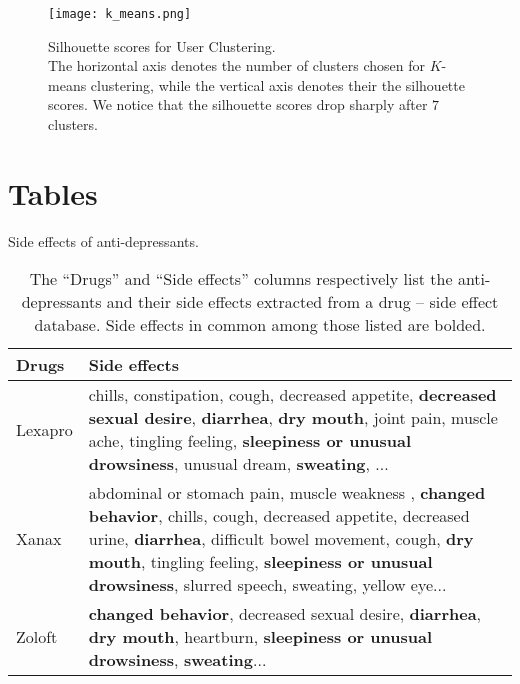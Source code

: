 \documentclass{bmcart}
\begin{document}
\begin{backmatter}
\begin{figure}[h!]
    \label{fig:PCA}
\end{figure}
\begin{figure}[h!]
    \centering
    \captionsetup{justification=centering}
    \texttt{[image: k\_means.png]}
    \caption{Silhouette scores for User Clustering. \\ The horizontal axis denotes the number of clusters chosen for $K$-means clustering, while the vertical axis denotes their the silhouette scores. We notice that the silhouette scores drop sharply after $7$ clusters.}
    \label{fig:KMeans}
\end{figure}

\pagebreak
\section*{Tables}
\begin{table}[h!]
  \caption{Side effects of anti-depressants.} 
  \footnotesize
  \begin{tabular}{l p{11cm}}
    \hline
    Drugs & Side effects \\ \hline
    Lexapro & chills, constipation, cough, decreased appetite, \textbf{decreased sexual desire}, \textbf{diarrhea}, \textbf{dry mouth}, joint pain, muscle ache, tingling feeling, \textbf{sleepiness or unusual drowsiness}, unusual dream, \textbf{sweating}, ... \\
    Xanax &  abdominal or stomach pain, muscle weakness
      , \textbf{changed behavior}, chills, cough, decreased appetite, decreased urine, \textbf{diarrhea}, difficult bowel movement, cough, \textbf{dry mouth}, tingling feeling, \textbf{sleepiness or unusual drowsiness}, slurred speech, sweating, yellow eye... \\
    Zoloft &  \textbf{changed behavior}, decreased sexual desire, \textbf{diarrhea}, \textbf{dry mouth}, heartburn, \textbf{sleepiness or unusual drowsiness}, \textbf{sweating}... \\ \hline
  \end{tabular}
  \caption*{The ``Drugs'' and ``Side effects'' columns respectively list the anti-depressants and their side effects extracted from a drug -- side effect database. Side effects in common among those listed are bolded.}
  \label{table:anti_depressant_side_effects}
\end{table}


\end{backmatter}
\end{document}

